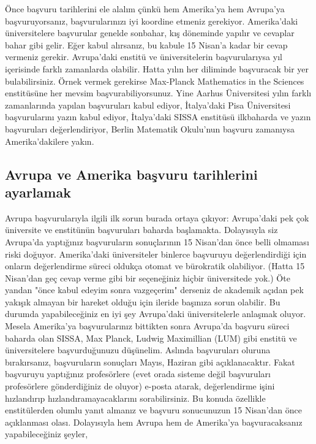 \documentclass[12pt]{article}
\theoremstyle{break}
\begin{document}
Önce başvuru tarihlerini ele alalım çünkü hem Amerika'ya hem Avrupa'ya başvuruyorsanız, başvurularınızı iyi koordine etmeniz gerekiyor. Amerika'daki üniversitelere başvurular genelde sonbahar, kış döneminde yapılır ve cevaplar bahar gibi gelir. Eğer kabul alırsanız, bu kabule 15 Nisan'a kadar bir cevap vermeniz gerekir. Avrupa'daki enstitü ve üniversitelerin başvurularıysa yıl içerisinde farklı zamanlarda olabilir. Hatta yılın her diliminde başvuracak bir yer bulabilirsiniz. Örnek vermek gerekirse Max-Planck Mathematics in the Sciences enstitüsüne her mevsim başvurabiliyorsunuz. Yine Aarhus Üniversitesi yılın farklı zamanlarında yapılan başvuruları kabul ediyor, İtalya'daki Pisa Üniversitesi başvurularını yazın kabul ediyor, İtalya'daki SISSA enstitüsü ilkbaharda ve yazın başvuruları değerlendiriyor, Berlin Matematik Okulu'nun başvuru zamanıysa Amerika’dakilere yakın.

\subsection{Avrupa ve Amerika başvuru tarihlerini ayarlamak}

Avrupa başvurularıyla ilgili ilk sorun burada ortaya çıkıyor: Avrupa'daki pek çok üniversite ve enstitünün başvuruları baharda başlamakta. Dolayısıyla siz Avrupa'da yaptığınız başvuruların sonuçlarının 15 Nisan'dan önce belli olmaması riski doğuyor. Amerika'daki üniversiteler binlerce başvuruyu değerlendirdiği için onların değerlendirme süreci oldukça otomat ve bürokratik olabiliyor. (Hatta 15 Nisan'dan geç cevap verme gibi bir seçeneğiniz hiçbir üniversitede yok.) Öte yandan "önce kabul edeyim sonra vazgeçerim" derseniz de akademik açıdan pek yakışık almayan bir hareket olduğu için ileride başınıza sorun olabilir. Bu durumda yapabileceğiniz en iyi şey Avrupa'daki üniversitelerle anlaşmak oluyor. Mesela Amerika'ya başvurularınız bittikten sonra Avrupa'da başvuru süreci baharda olan SISSA, Max Planck, Ludwig Maximillian (LUM) gibi enstitü ve üniversitelere başvurduğunuzu düşünelim. Aslında başvuruları oluruna bırakırsanız, başvuruların sonuçları Mayıs, Haziran gibi açıklanacaktır. Fakat başvuruyu yaptığınız profesörlere (evet orada sisteme değil başvuruları profesörlere gönderdiğiniz de oluyor) e-posta atarak, değerlendirme işini hızlandırıp hızlandıramayacaklarını sorabilirsiniz. Bu konuda özellikle enstitülerden olumlu yanıt almanız ve başvuru sonucunuzun 15 Nisan’dan önce açıklanması olası. Dolayısıyla hem Avrupa hem de Amerika’ya başvuracaksanız yapabileceğiniz şeyler, 
\end{document}
